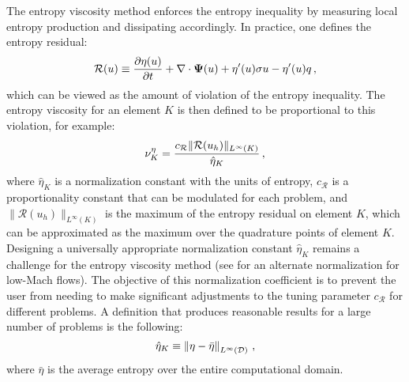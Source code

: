 The entropy viscosity method enforces the entropy inequality by measuring
local entropy production and dissipating accordingly. In practice, one
defines the entropy residual:
\begin{equation}
  \mathcal{R}(u) \equiv \frac{\partial \eta(u)}{\partial t} + \nabla\cdot\mathbf{\Psi}(u)
    + \eta'(u)\sigma u - \eta'(u)q \,,
\end{equation}
which can be viewed as the amount of violation of the entropy inequality.
The entropy viscosity for an element $K$ is then defined to be proportional
to this violation, for example:
\begin{equation}
  \nu^\eta_K = \frac{c_\mathcal{R}\|\mathcal{R}(u_h)\|_{L^\infty(K)}}
    {\hat{\eta}_K}
    \,,
\end{equation}
where $\hat{\eta}_K$ is a normalization constant with the units of entropy,
$c_\mathcal{R}$ is a proportionality constant that can be modulated for
each problem, and $\|\mathcal{R}(u_h)\|_{L^\infty(K)}$ is the maximum of the
entropy residual on element $K$, which can be approximated as the maximum over
the quadrature points of element $K$.
Designing a universally appropriate normalization constant $\hat{\eta}_K$ remains
a challenge for the entropy viscosity method (see \cite{marco_low_mach}
for an alternate normalization for low-Mach flows).
The objective of this
normalization coefficient is to prevent the user from needing to make significant
adjustments to the tuning parameter $c_\mathcal{R}$ for different problems.
A definition that produces reasonable results for a large number of problems
is the following:
\begin{equation}
  \hat{\eta}_K \equiv \left\|\eta-\bar{\eta}\right\|_{L^\infty(\mathcal{D})} \,,
\end{equation}
where $\bar{\eta}$ is the average entropy over the entire computational domain.

